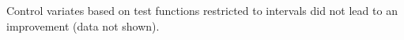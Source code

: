 Control variates based on test functions restricted to intervals did
not lead to an improvement (data not shown).


